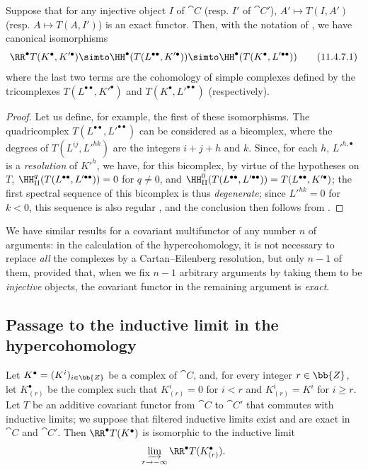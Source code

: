 \begin{proposition}[11.4.7]
\label{0.11.4.7}
Suppose that for any injective object $I$ of $\cat{C}$ (resp. $I'$ of $\cat{C}'$), $A'\mapsto T(I, A')$ (resp. $A\mapsto T(A, I')$) is an exact functor.
Then, with the notation of , we have canonical isomorphisms
\[
  \label{0.11.4.7.1} \RR^\bullet T(K^\bullet, K'^\bullet) \simto \HH^\bullet(T(L^{\bullet\bullet}, K'^\bullet)) \simto \HH^\bullet(T(K^\bullet, L'^{\bullet\bullet})) \tag{11.4.7.1} 
\]
where the last two terms are the cohomology of simple complexes defined by the tricomplexes $T(L^{\bullet\bullet}, K'^\bullet)$ and $T(K^\bullet, L'^{\bullet\bullet})$ (respectively).
\end{proposition}

\begin{proof}
Let us define, for example, the first of these isomorphisms.
The quadricomplex $T(L^{\bullet\bullet}, L'^{\bullet\bullet})$ can be considered as a bicomplex, where the degrees of $T(L^{ij}, L'^{hk})$ are the integers $i+j+h$ and $k$.
Since, for each $h$, ${L'}^{h,\bullet}$ is a \emph{resolution} of ${K'}^h$, we have, for this bicomplex, by virtue of the hypotheses on $T$, $\HH_\mathrm{II}^q(T(L^{\bullet\bullet}, L'^{\bullet\bullet}))=0$ for $q\neq 0$, and $\HH_\mathrm{II}^0(T(L^{\bullet\bullet}, L'^{\bullet\bullet})) = T(L^{\bullet\bullet}, K'^\bullet)$;
the first spectral sequence of this bicomplex is thus \emph{degenerate};
since $L'^{hk}=0$ for $k<0$, this sequence is also regular , and the conclusion then follows from .
\end{proof}

We have similar results for a covariant multifunctor of any number $n$ of arguments: in the calculation of the hypercohomology, it is not necessary to replace \emph{all} the complexes 
by a Cartan--Eilenberg resolution, but only $n-1$ of them, provided that, when we fix $n-1$ arbitrary arguments by taking them to be \emph{injective} objects, the covariant functor in the remaining argument is \emph{exact}.


\subsection{Passage to the inductive limit in the hypercohomology}
\label{subsection:0.11.5}

\begin{lemma}[11.5.1]
\label{0.11.5.1}
Let $K^\bullet=(K^i)_{i\in\bb{Z}}$ be a complex of $\cat{C}$, and, for every integer $r\in\bb{Z}$, let $K^\bullet_{(r)}$ be the complex such that $K^i_{(r)}=0$ for $i<r$ and $K^i_{(r)}=K^i$ for $i\geq r$.
Let $T$ be an additive covariant functor
from $\cat{C}$ to $\cat{C}'$ that commutes with inductive limits; we suppose that filtered inductive limits exist and are exact in $\cat{C}$ and $\cat{C}'$.
Then $\RR^\bullet T(K^\bullet)$ is isomorphic to the inductive limit
\[
  \varinjlim_{r\to-\infty}\RR^\bullet T(K^\bullet_{(r)}).
\]
\end{lemma}

